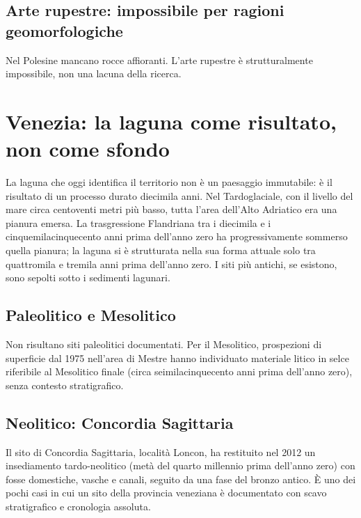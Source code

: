 \subsection{Arte rupestre: impossibile per ragioni geomorfologiche}

Nel Polesine mancano rocce affioranti. L'arte rupestre è strutturalmente impossibile, non una lacuna della ricerca.

\section{Venezia: la laguna come risultato, non come sfondo}

La laguna che oggi identifica il territorio non è un paesaggio immutabile: è il risultato di un processo durato diecimila anni. Nel Tardoglaciale, con il livello del mare circa centoventi metri più basso, tutta l'area dell'Alto Adriatico era una pianura emersa. La trasgressione Flandriana tra i diecimila e i cinquemilacinquecento anni prima dell'anno zero ha progressivamente sommerso quella pianura; la laguna si è strutturata nella sua forma attuale solo tra quattromila e tremila anni prima dell'anno zero. I siti più antichi, se esistono, sono sepolti sotto i sedimenti lagunari.

\subsection{Paleolitico e Mesolitico}

Non risultano siti paleolitici documentati. Per il Mesolitico, prospezioni di superficie dal 1975 nell'area di Mestre hanno individuato materiale litico in selce riferibile al Mesolitico finale (circa seimilacinquecento anni prima dell'anno zero), senza contesto stratigrafico.

\subsection{Neolitico: Concordia Sagittaria}

Il sito di Concordia Sagittaria, località Loncon, ha restituito nel 2012 un insediamento tardo-neolitico (metà del quarto millennio prima dell'anno zero) con fosse domestiche, vasche e canali, seguito da una fase del bronzo antico. È uno dei pochi casi in cui un sito della provincia veneziana è documentato con scavo stratigrafico e cronologia assoluta.

